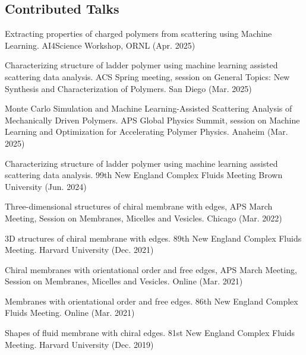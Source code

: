 \documentclass[11pt,letterpaper]{article}
\begin{document}
\subsection*{Contributed Talks}
\begin{etaremune}
    \item Extracting properties of charged polymers from scattering using Machine Learning. AI4Science Workshop, ORNL (Apr. 2025)
    \item Characterizing structure of ladder polymer using machine learning assisted scattering data analysis. ACS Spring meeting, session on General Topics: New Synthesis and Characterization of Polymers. San Diego (Mar. 2025)
    \item Monte Carlo Simulation and Machine Learning-Assisted Scattering Analysis of Mechanically Driven Polymers. APS Global Physics Summit, session on Machine Learning and Optimization for Accelerating Polymer Physics. Anaheim (Mar. 2025)
    \item Characterizing structure of ladder polymer using machine learning assisted scattering data analysis. 99th New England Complex Fluids Meeting Brown University (Jun. 2024)
    \item Three-dimensional structures of chiral membrane with edges, APS March Meeting, Session on Membranes, Micelles and Vesicles. Chicago (Mar. 2022)
    \item 3D structures of chiral membrane with edges. 89th New England Complex Fluids Meeting. Harvard University (Dec. 2021)
    \item Chiral membranes with orientational order and free edges, APS March Meeting, Session on Membranes, Micelles and Vesicles. Online (Mar. 2021)
    \item Membranes with orientational order and free edges. 86th New England Complex Fluids Meeting. Online (Mar. 2021)
    \item Shapes of fluid membrane with chiral edges. 81st New England Complex Fluids Meeting. Harvard University (Dec. 2019)
\end{etaremune}
\end{document}
